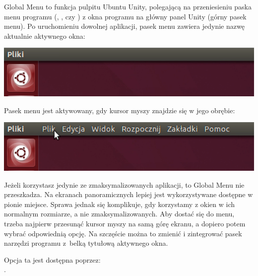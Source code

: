 Global Menu to funkcja pulpitu Ubuntu Unity, polegającą na przeniesieniu paska menu programu (, , czy ) z okna programu na główny panel Unity (górny pasek menu). Po uruchomieniu dowolnej aplikacji, pasek menu zawiera jedynie nazwę aktualnie aktywnego okna:

\begin{center}
	\includegraphics[width=\linewidth]{images/unity_menu_bar2.png}
\end{center}

Pasek menu jest aktywowany, gdy kursor myszy znajdzie się w jego obrębie:

\begin{center}
	\includegraphics[width=\linewidth]{images/unity_menu_bar3.png}
\end{center}

Jeżeli korzystasz jedynie ze zmaksymalizowanych aplikacji, to Global Menu nie przeszkadza. Na ekranach panoramicznych lepiej jest wykorzystywane dostępne w pionie miejsce. Sprawa jednak się komplikuje, gdy korzystamy z okien w ich normalnym rozmiarze, a nie zmaksymalizowanych. Aby dostać się do menu, trzeba najpierw przesunąć kursor myszy na samą górę ekranu, a dopiero potem wybrać odpowiednią opcję. Na szczęście można to zmienić i zintegrować pasek narzędzi programu z~belką tytułową aktywnego okna. 

Opcja ta jest dostępna poprzez:\\
\noindent {}.
